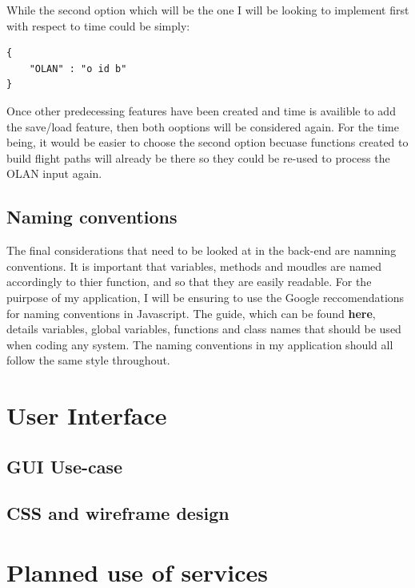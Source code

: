 While the second option which will be the one I will be looking to implement first with respect to time could be simply:

\lstset{language=JavaScript}
\medskip
\begin{lstlisting}[caption=A JSON means of holding break downs of manouvres with each one holding information on different varients of the move such as inverse and reverse and description of the OLAN notation]
{
	"OLAN" : "o id b"
}
\end{lstlisting}
\label{listing:json}

Once other predecessing features have been created and time is availible to add the save/load feature, then both ooptions will be considered again. For the time being, it would be easier to choose the second option becuase functions created to build flight paths will already be there so they could be re-used to process the OLAN input again.

\subsection{Naming conventions}
The final considerations that need to be looked at in the back-end are namning conventions. It is important that variables, methods and moudles are named accordingly to thier function, and so that they are easily readable. For the puirpose of my application, I will be ensuring to use the Google reccomendations for naming conventions in Javascript. The guide, which can be found \textbf{here}, details variables, global variables, functions and class names that should be used when coding any system. The naming conventions in my application should all follow the same style throughout.

\section{User Interface}

\subsection{GUI Use-case}

\subsection{CSS and wireframe design}

\section{Planned use of services}

